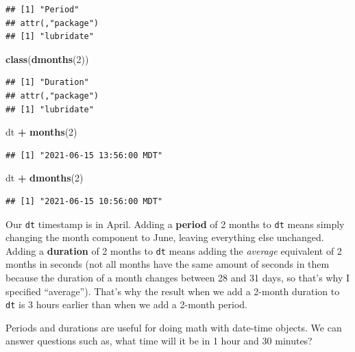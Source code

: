 \documentclass[
]{book}
\newenvironment{Shaded}{\begin{snugshade}}{\end{snugshade}}
\newcommand{\DecValTok}[1]{\textcolor[rgb]{0.00,0.00,0.81}{#1}}
\newcommand{\FunctionTok}[1]{\textcolor[rgb]{0.13,0.29,0.53}{\textbf{#1}}}
\newcommand{\NormalTok}[1]{#1}
\newcommand{\SpecialCharTok}[1]{\textcolor[rgb]{0.81,0.36,0.00}{\textbf{#1}}}
\begin{document}
\begin{verbatim}
## [1] "Period"
## attr(,"package")
## [1] "lubridate"
\end{verbatim}

\begin{Shaded}
\begin{Highlighting}[]
\FunctionTok{class}\NormalTok{(}\FunctionTok{dmonths}\NormalTok{(}\DecValTok{2}\NormalTok{))}
\end{Highlighting}
\end{Shaded}

\begin{verbatim}
## [1] "Duration"
## attr(,"package")
## [1] "lubridate"
\end{verbatim}

\begin{Shaded}
\begin{Highlighting}[]
\NormalTok{dt }\SpecialCharTok{+} \FunctionTok{months}\NormalTok{(}\DecValTok{2}\NormalTok{)}
\end{Highlighting}
\end{Shaded}

\begin{verbatim}
## [1] "2021-06-15 13:56:00 MDT"
\end{verbatim}

\begin{Shaded}
\begin{Highlighting}[]
\NormalTok{dt }\SpecialCharTok{+} \FunctionTok{dmonths}\NormalTok{(}\DecValTok{2}\NormalTok{)}
\end{Highlighting}
\end{Shaded}

\begin{verbatim}
## [1] "2021-06-15 10:56:00 MDT"
\end{verbatim}

Our \texttt{dt} timestamp is in April. Adding a \textbf{period} of 2 months to \texttt{dt} means simply changing the month component to June, leaving everything else unchanged. Adding a \textbf{duration} of 2 months to \texttt{dt} means adding the \emph{average} equivalent of 2 months in seconds (not all months have the same amount of seconds in them because the duration of a month changes between 28 and 31 days, so that's why I specified ``average''). That's why the result when we add a 2-month duration to \texttt{dt} is 3 hours earlier than when we add a 2-month period.

Periods and durations are useful for doing math with date-time objects. We can answer questions such as, what time will it be in 1 hour and 30 minutes?
\end{document}
